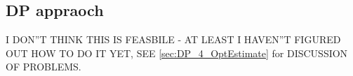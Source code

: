 \documentclass{article}
\begin{document}
\clearpage


\subsection{DP appraoch}
I DON''T THINK THIS IS FEASBILE - AT LEAST I HAVEN''T FIGURED OUT HOW TO DO IT
YET, SEE \cref{sec:DP_4_OptEstimate} for DISCUSSION OF PROBLEMS.

% 
% 
%  
%  
% 
% 
% 
% 
% 
% 
% 
\end{document}
